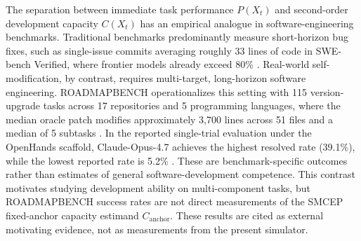 \documentclass[11pt,a4paper]{article}
\begin{document}
The separation between immediate task performance $P(X_t)$ and second-order development capacity $C(X_t)$ has an empirical analogue in software-engineering benchmarks. Traditional benchmarks predominantly measure short-horizon bug fixes, such as single-issue commits averaging roughly 33 lines of code in SWE-bench Verified, where frontier models already exceed 80\% \cite{xu2026roadmapbench}. Real-world self-modification, by contrast, requires multi-target, long-horizon software engineering. ROADMAPBENCH operationalizes this setting with 115 version-upgrade tasks across 17 repositories and 5 programming languages, where the median oracle patch modifies approximately 3,700 lines across 51 files and a median of 5 subtasks \cite{xu2026roadmapbench}. In the reported single-trial evaluation under the
OpenHands scaffold, Claude-Opus-4.7 achieves the highest resolved rate (39.1\%), while the lowest reported rate is 5.2\% \cite{xu2026roadmapbench}. These are benchmark-specific outcomes rather than
estimates of general software-development competence. This contrast motivates studying development ability on multi-component tasks, but ROADMAPBENCH success rates are not direct measurements of the SMCEP fixed-anchor capacity estimand $C_{\mathrm{anchor}}$. These results are cited as external motivating evidence, not as measurements from the present simulator.
\end{document}
